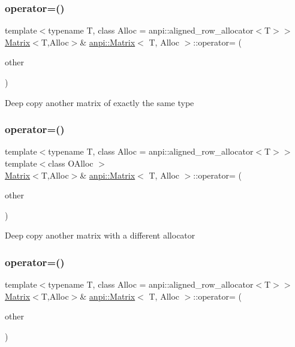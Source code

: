 \subsubsection{\texorpdfstring{operator=()}{operator=()}\hspace{0.1cm}{\footnotesize\ttfamily [1/3]}}
{\footnotesize\ttfamily template$<$typename T, class Alloc = anpi\+::aligned\+\_\+row\+\_\+allocator$<$\+T$>$$>$ \\
\hyperlink{classanpi_1_1Matrix}{Matrix}$<$T,Alloc$>$\& \hyperlink{classanpi_1_1Matrix}{anpi\+::\+Matrix}$<$ T, Alloc $>$\+::operator= (\begin{DoxyParamCaption}\item[{const \hyperlink{classanpi_1_1Matrix}{Matrix}$<$ T, Alloc $>$ \&}]{other }\end{DoxyParamCaption})}

Deep copy another matrix of exactly the same type \mbox{\label{classanpi_1_1Matrix_a59ccc766804762b9ec9a2186cbddbacc}} 
\subsubsection{\texorpdfstring{operator=()}{operator=()}\hspace{0.1cm}{\footnotesize\ttfamily [2/3]}}
{\footnotesize\ttfamily template$<$typename T, class Alloc = anpi\+::aligned\+\_\+row\+\_\+allocator$<$\+T$>$$>$ \\
template$<$class O\+Alloc $>$ \\
\hyperlink{classanpi_1_1Matrix}{Matrix}$<$T,Alloc$>$\& \hyperlink{classanpi_1_1Matrix}{anpi\+::\+Matrix}$<$ T, Alloc $>$\+::operator= (\begin{DoxyParamCaption}\item[{const \hyperlink{classanpi_1_1Matrix}{Matrix}$<$ T, O\+Alloc $>$ \&}]{other }\end{DoxyParamCaption})}

Deep copy another matrix with a different allocator \mbox{\label{classanpi_1_1Matrix_a7995acac7bc35fe918dbec071c2b2359}} 
\subsubsection{\texorpdfstring{operator=()}{operator=()}\hspace{0.1cm}{\footnotesize\ttfamily [3/3]}}
{\footnotesize\ttfamily template$<$typename T, class Alloc = anpi\+::aligned\+\_\+row\+\_\+allocator$<$\+T$>$$>$ \\
\hyperlink{classanpi_1_1Matrix}{Matrix}$<$T,Alloc$>$\& \hyperlink{classanpi_1_1Matrix}{anpi\+::\+Matrix}$<$ T, Alloc $>$\+::operator= (\begin{DoxyParamCaption}\item[{\hyperlink{classanpi_1_1Matrix}{Matrix}$<$ T, Alloc $>$ \&\&}]{other }\end{DoxyParamCaption})}

